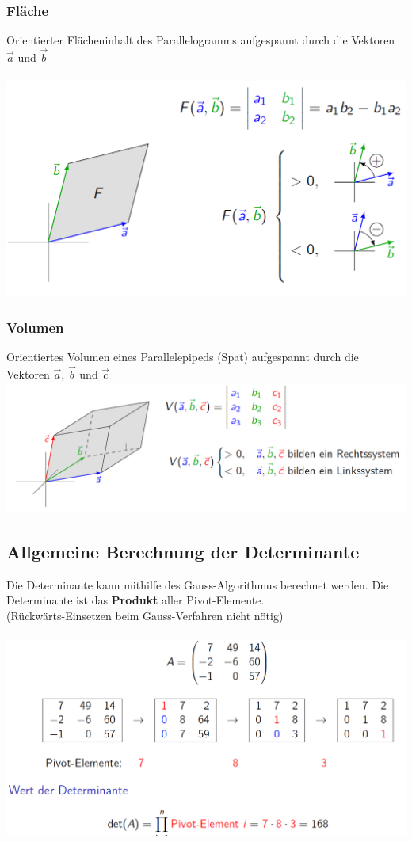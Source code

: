 			\subsubsection{Fläche}
			Orientierter Flächeninhalt des Parallelogramms aufgespannt durch die Vektoren $\vec{a}$ und $\vec{b}$ \\
			\\
 			\includegraphics[width=0.7\linewidth]{Bilder/flaeche-det} \\
			
			
			\subsubsection{Volumen}
		    Orientiertes Volumen eines Parallelepipeds (Spat) aufgespannt durch die Vektoren $\vec{a}$, $\vec{b}$ und $\vec{c}$ \\
			\includegraphics[width=0.9\linewidth]{Bilder/volumen-det} \\
			
			
							
								
			\subsection{Allgemeine Berechnung der Determinante}
			Die Determinante kann mithilfe des Gauss-Algorithmus berechnet werden. Die Determinante ist das \textbf{Produkt} aller Pivot-Elemente. \\
			(Rückwärts-Einsetzen beim Gauss-Verfahren nicht nötig) \\
			\\
			 \includegraphics[width=0.7\linewidth]{Bilder/wert-determinante}
			 

